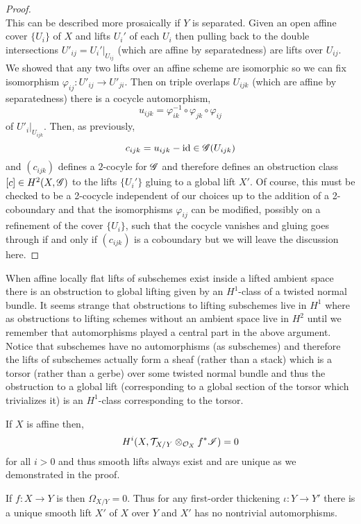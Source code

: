 \documentclass[12pt]{article}
\begin{document}
\begin{proof}
\bigskip\\
This can be described more prosaically if $Y$ is separated. Given an open affine cover $\{ U_i \}$ of $X$ and lifts $U_i'$ of each $U_i$ then pulling back to the double intersections $U'_{ij} = U_{i}'|_{U_{ij}}$ (which are affine by separatedness) are lifts over $U_{ij}$. We showed that any two lifts over an affine scheme are isomorphic so we can fix isomorphism $\varphi_{ij} : U'_{ij} \to U'_{ji}$. Then on triple overlaps $U_{ijk}$ (which are affine by separatedness) there is a cocycle automorphism,
\[ u_{ijk} = \varphi_{ik}^{-1} \circ \varphi_{jk} \circ \varphi_{ij} \]
of $U'_i|_{U_{ijk}}$. Then, as previously,
\[ c_{ijk} = u_{ijk} - \mathrm{id} \in \mathscr{G}(U_{ijk}) \]
and $(c_{ijk})$ defines a $2$-cocyle for $\mathscr{G}$ and therefore defines an obstruction class $[c] \in H^2(X, \mathscr{G})$ to the lifts $\{ U_i' \}$ gluing to a global lift $X'$. Of course, this must be checked to be a 2-cocycle independent of our choices up to the addition of a 2-coboundary and that the isomorphisms $\varphi_{ij}$ can be modified, possibly on a refinement of the cover $\{ U_i \}$, such that the cocycle vanishes and gluing goes through if and only if $(c_{ijk})$ is a coboundary but we will leave the discussion here.
\end{proof}

\begin{rmk}
When affine locally flat lifts of subschemes exist inside a lifted ambient space there is an obstruction to global lifting given by an $H^1$-class of a twisted normal bundle. It seems strange that obstructions to lifting subschemes live in $H^1$ where as obstructions to lifting schemes without an ambient space live in $H^2$ until we remember that automorphisms played a central part in the above argument. Notice that subschemes have no automorphisms (as subschemes) and therefore the lifts of subschemes actually form a sheaf (rather than a stack) which is a torsor (rather than a gerbe) over some twisted normal bundle and thus the obstruction to a global lift (corresponding to a global section of the torsor which trivializes it) is an $H^1$-class corresponding to the torsor.
\end{rmk}


\begin{example}
If $X$ is affine then,
\[ H^i(X, \mathcal{T}_{X/Y} \otimes_{\mathcal{O}_{X}} f^* \mathscr{I}) = 0 \]
for all $i > 0$ and thus smooth lifts always exist and are unique as we demonstrated in the proof.
\end{example}

\begin{example}
If $f : X \to Y$ is \etale then $\Omega_{X/Y} = 0$. Thus for any first-order thickening $\iota : Y \to Y'$ there is a unique smooth lift $X'$ of $X$ over $Y$ and $X'$ has no nontrivial automorphisms.
\end{example}
\end{document}
